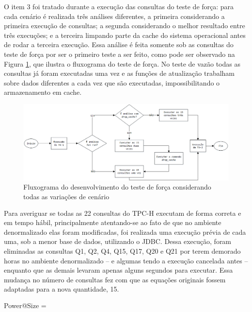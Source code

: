 O item 3 foi tratado durante a execução das consultas do teste de força: para cada cenário é realizada três 
análises diferentes, a primeira considerando a primeira execução de consultas; a segunda considerando o melhor 
resultado entre três execuções; e a terceira limpando parte da cache do sistema operacional antes de 
rodar a terceira execução. Essa análise é feita somente sob as consultas do teste de força por ser o primeiro 
teste a ser feito, como pode ser observado na Figura \ref{fig:power_flux}, que ilustra o fluxograma do teste de força. No teste de vazão todas as consultas já foram executadas 
uma vez e as funções de atualização trabalham sobre dados diferentes a cada vez que são executadas, impossibilitando 
o armazenamento em cache.

\begin{figure}[htpb]
	\centering
        \includegraphics[width=\textwidth]{power_flux}
	\caption{Fluxograma do desenvolvimento do teste de força considerando todas as variações de cenário}
	\label{fig:power_flux}
\end{figure}

Para averiguar se todas as 22 consultas do TPC-H executam de forma correta e em tempo hábil, principalmente 
atentando-se ao fato de que no ambiente denormalizado elas foram modificadas, foi realizada uma execução 
prévia de cada uma, sob a menor base de dados, utilizando o JDBC. Dessa execução, foram eliminadas as consultas 
Q1, Q2, Q4, Q15, Q17, Q20 e Q21 por terem demorado horas no ambiente denormalizado -- e algumas tendo a execução 
cancelada antes -- enquanto que as demais levaram apenas alguns segundos para executar. Essa mudança no número 
de consultas fez com que as equações originais fossem adaptadas para a nova quantidade, 15.

\begin{myequation}%
\label{eq:1-2}
{\scriptstyle Power@Size} =  %
\end{myequation}
%

